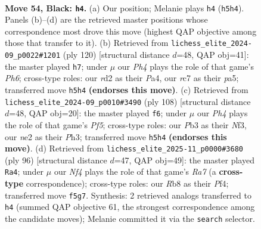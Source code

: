 \documentclass[11pt]{article}
\begin{document}
\clearpage

\begin{figure}[p]\centering
\begin{subfigure}{0.46\textwidth}\centering
\resizebox{\linewidth}{!}{%
\newchessgame
\chessboard[
  setfen={1r6/2R5/3pk3/5n1p/6p1/1p6/3RNKPr/8 b - - 1 54},
  showmover=false,
  pgfstyle=straightmove, color=movearrow, markmove={h5-h4}
]}
\caption{}
\end{subfigure}\hfill
\begin{subfigure}{0.46\textwidth}\centering
\resizebox{\linewidth}{!}{%
\newchessgame
\chessboard[
  setfen={6R1/8/1p5P/p4kP1/P4n2/1P3r2/5P2/5K2 w - - 5 61},
  showmover=false,
  pgfstyle=straightmove, color=movearrow, markmove={h6-h7}
]}
\caption{}
\end{subfigure}
\\[4pt]
\begin{subfigure}{0.46\textwidth}\centering
\resizebox{\linewidth}{!}{%
\newchessgame
\chessboard[
  setfen={4r3/8/6N1/2k2PK1/1pn3P1/5N1P/r1P2R2/8 w - - 7 55},
  showmover=false,
  pgfstyle=straightmove, color=movearrow, markmove={f5-f6}
]}
\caption{}
\end{subfigure}\hfill
\begin{subfigure}{0.46\textwidth}\centering
\resizebox{\linewidth}{!}{%
\newchessgame
\chessboard[
  setfen={4r3/R3Pk2/2r5/8/2p2P2/2R3P1/P7/6K1 w - - 3 49},
  showmover=false,
  pgfstyle=straightmove, color=movearrow, markmove={a7-a4}
]}
\caption{}
\end{subfigure}
\caption{\textbf{Move 54, Black: \texttt{h4}.} (a) Our position; Melanie plays \texttt{h4} (\texttt{h5h4}). Panels (b)--(d) are the retrieved master positions whose correspondence most drove this move (highest QAP objective among those that transfer to it). (b) Retrieved from \texttt{lichess\_elite\_2024-09\_p0022\#1201} (ply 120) [structural distance $d$=48, QAP obj=41]: the master played \texttt{h7}; under $\mu$ our \emph{Ph4} plays the role of that game's \emph{Ph6}; cross-type roles: our \emph{r}d2 as their \emph{P}a4, our \emph{r}c7 as their \emph{p}a5; transferred move \texttt{h5h4} \textbf{(endorses this move)}. (c) Retrieved from \texttt{lichess\_elite\_2024-09\_p0010\#3490} (ply 108) [structural distance $d$=48, QAP obj=20]: the master played \texttt{f6}; under $\mu$ our \emph{Ph4} plays the role of that game's \emph{Pf5}; cross-type roles: our \emph{P}b3 as their \emph{N}f3, our \emph{n}e2 as their \emph{P}h3; transferred move \texttt{h5h4} \textbf{(endorses this move)}. (d) Retrieved from \texttt{lichess\_elite\_2025-11\_p0000\#3680} (ply 96) [structural distance $d$=47, QAP obj=49]: the master played \texttt{Ra4}; under $\mu$ our \emph{Nf4} plays the role of that game's \emph{Ra7} (a \textbf{cross-type} correspondence); cross-type roles: our \emph{R}b8 as their \emph{P}f4; transferred move \texttt{f5g7}. Synthesis: 2 retrieved analogs transferred to \texttt{h4} (summed QAP objective 61, the strongest correspondence among the candidate moves); Melanie committed it via the \texttt{search} selector.}
\label{fig:thought-m107}
\end{figure}
\end{document}
